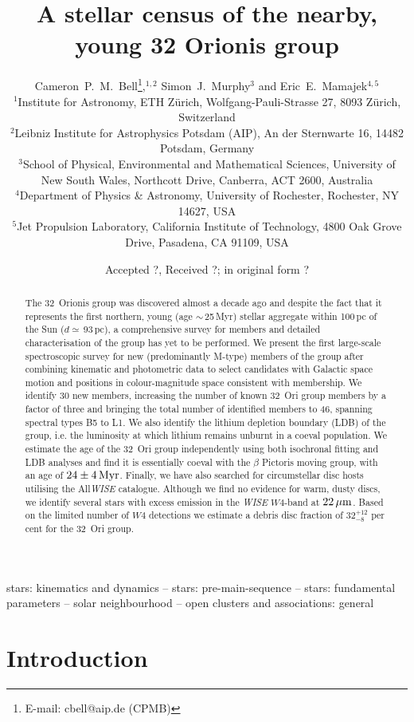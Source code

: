 \documentclass[usenatbib]{mnras}
\title[32 Orionis group]{A stellar census of the nearby, young 32 Orionis group}
\author[C.~P.~M.~Bell et al.]{Cameron~P.~M.~Bell\thanks{E-mail:
  cbell@aip.de (CPMB)},$^{1,2}$ Simon~J.~Murphy$^{3}$ and Eric~E.~Mamajek$^{4,5}$\\
$^{1}$Institute for Astronomy, ETH Z{\"u}rich, Wolfgang-Pauli-Strasse 27, 8093 Z{\"u}rich, Switzerland\\
$^{2}$Leibniz Institute for Astrophysics Potsdam (AIP), An der Sternwarte 16, 14482 Potsdam, Germany\\
$^{3}$School of Physical, Environmental and Mathematical Sciences, University of New South Wales, Northcott Drive, Canberra, ACT 2600, Australia\\
$^{4}$Department of Physics \& Astronomy, University of Rochester, Rochester, NY 14627, USA\\
$^{5}$Jet Propulsion Laboratory, California Institute of Technology, 4800 Oak Grove Drive, Pasadena, CA 91109, USA}
\begin{document}
\date{Accepted ?, Received ?; in original form ?}


\maketitle

\label{firstpage}

\begin{abstract}
The 32~Orionis group was discovered almost a decade ago and despite
the fact that it represents the first northern, young (age
$\sim$\,25\,Myr) stellar aggregate within 100\,pc of the Sun ($d
\simeq$\,93\,pc), a comprehensive survey for members and detailed
characterisation of the group has yet to be performed. We present the
first large-scale spectroscopic survey for new (predominantly M-type)
members of the group after combining kinematic and photometric data to
select candidates with Galactic space motion and positions in
colour-magnitude space consistent with membership. We identify 30 new
members, increasing the number of known 32~Ori group members by a
factor of three and bringing the total number of identified members to
46, spanning spectral types B5 to L1. We also identify the lithium
depletion boundary (LDB) of the group, i.e. the luminosity at which
lithium remains unburnt in a coeval population. We estimate the age of
the 32~Ori group independently using both isochronal fitting and LDB
analyses and find it is essentially coeval with the $\beta$ Pictoris
moving group, with an age of $24\pm4\,\rm{Myr}$. Finally, we have also
searched for circumstellar disc hosts utilising the All\emph{WISE}
catalogue. Although we find no evidence for warm, dusty discs, we
identify several stars with excess emission in the \emph{WISE}
$W4$-band at $22\,\rm{\mu m}$. Based on the limited number of $W4$
detections we estimate a debris disc fraction of $32^{+12}_{-8}$ per
cent for the 32~Ori group.
\end{abstract}

\begin{keywords}
  stars: kinematics and dynamics -- stars: pre-main-sequence --
  stars: fundamental parameters -- solar neighbourhood --
  open clusters and associations: general
\end{keywords}

\section{Introduction}
\label{introduction}
\end{document}
